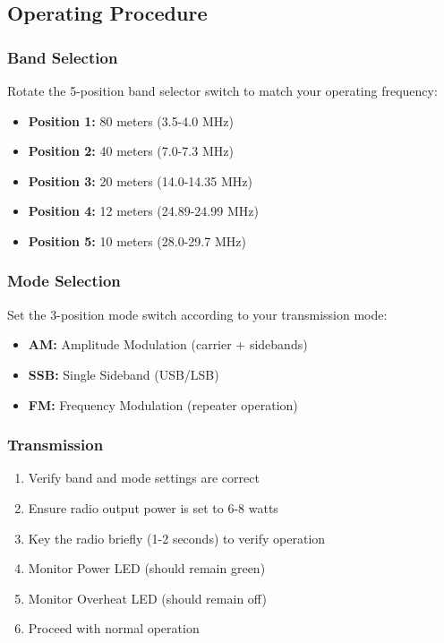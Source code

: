 \documentclass[11pt,a4paper]{article}
\begin{document}
\subsection{Operating Procedure}

\subsubsection{Band Selection}
Rotate the 5-position band selector switch to match your operating frequency:
\begin{itemize}
    \item \textbf{Position 1:} 80 meters (3.5-4.0 MHz)
    \item \textbf{Position 2:} 40 meters (7.0-7.3 MHz)  
    \item \textbf{Position 3:} 20 meters (14.0-14.35 MHz)
    \item \textbf{Position 4:} 12 meters (24.89-24.99 MHz)
    \item \textbf{Position 5:} 10 meters (28.0-29.7 MHz)
\end{itemize}

\subsubsection{Mode Selection}
Set the 3-position mode switch according to your transmission mode:
\begin{itemize}
    \item \textbf{AM:} Amplitude Modulation (carrier + sidebands)
    \item \textbf{SSB:} Single Sideband (USB/LSB)
    \item \textbf{FM:} Frequency Modulation (repeater operation)
\end{itemize}

\subsubsection{Transmission}
\begin{enumerate}
    \item Verify band and mode settings are correct
    \item Ensure radio output power is set to 6-8 watts
    \item Key the radio briefly (1-2 seconds) to verify operation
    \item Monitor Power LED (should remain green)
    \item Monitor Overheat LED (should remain off)
    \item Proceed with normal operation
\end{enumerate}
\end{document}
